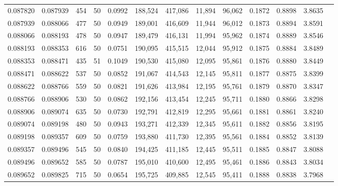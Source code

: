 \begin{tabular}{rrrrrrrrrrrrr}
0.087820 & 0.087939 &   454 &  50 &                                     0.0992 & 188,524 & 417,086 &  11,894 &  96,062 & 0.1872 & 0.8898 & 3.8635 \\
0.087939 & 0.088066 &   477 &  50 &                                     0.0949 & 189,001 & 416,609 &  11,944 &  96,012 & 0.1873 & 0.8894 & 3.8591 \\
0.088066 & 0.088193 &   478 &  50 &                                     0.0947 & 189,479 & 416,131 &  11,994 &  95,962 & 0.1874 & 0.8889 & 3.8546 \\
0.088193 & 0.088353 &   616 &  50 &                                     0.0751 & 190,095 & 415,515 &  12,044 &  95,912 & 0.1875 & 0.8884 & 3.8489 \\
0.088353 & 0.088471 &   435 &  51 &                                     0.1049 & 190,530 & 415,080 &  12,095 &  95,861 & 0.1876 & 0.8880 & 3.8449 \\
0.088471 & 0.088622 &   537 &  50 &                                     0.0852 & 191,067 & 414,543 &  12,145 &  95,811 & 0.1877 & 0.8875 & 3.8399 \\
0.088622 & 0.088766 &   559 &  50 &                                     0.0821 & 191,626 & 413,984 &  12,195 &  95,761 & 0.1879 & 0.8870 & 3.8347 \\
0.088766 & 0.088906 &   530 &  50 &                                     0.0862 & 192,156 & 413,454 &  12,245 &  95,711 & 0.1880 & 0.8866 & 3.8298 \\
0.088906 & 0.089074 &   635 &  50 &                                     0.0730 & 192,791 & 412,819 &  12,295 &  95,661 & 0.1881 & 0.8861 & 3.8240 \\
0.089074 & 0.089198 &   480 &  50 &                                     0.0943 & 193,271 & 412,339 &  12,345 &  95,611 & 0.1882 & 0.8856 & 3.8195 \\
0.089198 & 0.089357 &   609 &  50 &                                     0.0759 & 193,880 & 411,730 &  12,395 &  95,561 & 0.1884 & 0.8852 & 3.8139 \\
0.089357 & 0.089496 &   545 &  50 &                                     0.0840 & 194,425 & 411,185 &  12,445 &  95,511 & 0.1885 & 0.8847 & 3.8088 \\
0.089496 & 0.089652 &   585 &  50 &                                     0.0787 & 195,010 & 410,600 &  12,495 &  95,461 & 0.1886 & 0.8843 & 3.8034 \\
0.089652 & 0.089825 &   715 &  50 &                                     0.0654 & 195,725 & 409,885 &  12,545 &  95,411 & 0.1888 & 0.8838 & 3.7968 \\

\end{tabular}
